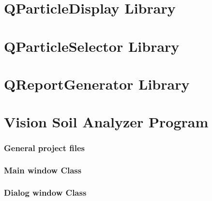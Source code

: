 \documentclass[11pt,fleqn,,a4paper,twoside,openright]{book}
\begin{document}
\chapter{QParticleDisplay Library}



\newpage

\chapter{QParticleSelector Library}



\newpage

\chapter{QReportGenerator Library}



\newpage

\chapter{Vision Soil Analyzer Program}
\subsection*{General project files}


\newpage
\subsection*{Main window Class}


\newpage
\subsection*{Dialog window Class}


\newpage
\end{document}

